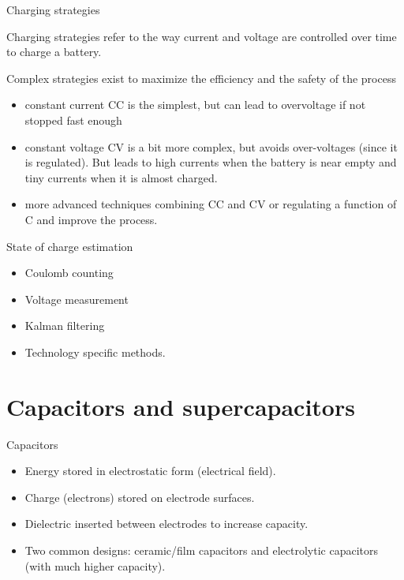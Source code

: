 \begin{frame}{Charging strategies}

Charging strategies refer to the way current and voltage are controlled over time to charge a battery.

Complex strategies exist to maximize the efficiency and the safety of the process

\begin{itemize}
  \item constant current CC is the simplest, but can lead to overvoltage if not stopped fast enough
  \item constant voltage CV is a bit more complex, but avoids over-voltages (since it is regulated). But leads to high currents when the battery is near empty and tiny currents when it is almost charged.
  \item more advanced techniques combining CC and CV or regulating a function of C and improve the process.
\end{itemize}

\end{frame}\begin{frame}{State of charge estimation}
\begin{itemize}
  \item Coulomb counting
  \item Voltage measurement
  \item Kalman filtering
  \item Technology specific methods.
\end{itemize}
\end{frame}

\section{Capacitors and supercapacitors}
\begin{frame}{Capacitors}
\begin{itemize}
  \item Energy stored in electrostatic form (electrical field).
  \item Charge (electrons) stored on electrode surfaces.
  \item Dielectric inserted between electrodes to increase capacity.
  \item Two common designs: ceramic/film capacitors and electrolytic capacitors (with much higher capacity).
\end{itemize}

\end{frame}

